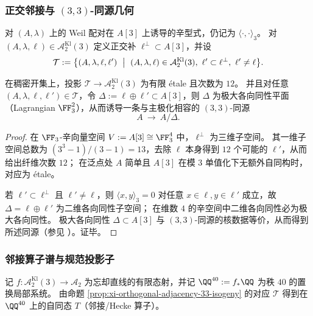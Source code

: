 \subsubsection{正交邻接与 \texorpdfstring{$(3,3)$}{(3,3)}-同源几何}
对 \((A,\lambda)\) 上的 Weil 配对在 \(A[3]\) 上诱导的辛型式，仍记为 \(\langle\cdot,\cdot\rangle_3\)。
对 \((A,\lambda,\ell)\in\mathcal A_2^{\mathrm{Kl}}(3)\) 定义正交补 \(\ell^\perp\subset A[3]\)，并设
\[
\mathcal T
:=
\bigl\{(A,\lambda,\ell,\ell')\ \bigm|\ (A,\lambda,\ell)\in\mathcal A_2^{\mathrm{Kl}}(3),\ \ell'\subset \ell^\perp,\ \ell'\neq \ell\bigr\}.
\]

\begin{proposition}\label{prop:xi-orthogonal-adjacency-33-isogeny}
在稠密开集上，投影 \(\mathcal T\to\mathcal A_2^{\mathrm{Kl}}(3)\) 为有限 \'etale 且次数为 \(12\)。
并且对任意 \((A,\lambda,\ell,\ell')\in\mathcal T\)，令 \(\Delta:=\ell\oplus \ell'\subset A[3]\)，则 \(\Delta\) 为极大各向同性平面（Lagrangian \(\FF_3^2\)），从而诱导一条与主极化相容的 \((3,3)\)-同源
\[
A\ \longrightarrow\ A/\Delta.
\]
\end{proposition}
\begin{proof}
在 \(\FF_3\)-辛向量空间 \(V:=A[3]\cong \FF_3^4\) 中，\(\ell^\perp\) 为三维子空间。
其一维子空间总数为 \((3^3-1)/(3-1)=13\)，去除 \(\ell\) 本身得到 \(12\) 个可能的 \(\ell'\)，从而给出纤维次数 \(12\)；
在泛点处 \(A\) 简单且 \(A[3]\) 在模 \(3\) 单值化下无额外自同构时，对应为 \'etale。
\par
若 \(\ell'\subset\ell^\perp\) 且 \(\ell'\neq \ell\)，则 \(\langle x,y\rangle_3=0\) 对任意 \(x\in\ell,y\in\ell'\) 成立，故 \(\Delta=\ell\oplus\ell'\) 为二维各向同性子空间；
在维数 \(4\) 的辛空间中二维各向同性必为极大各向同性。
极大各向同性 \(\Delta\subset A[3]\) 与 \((3,3)\)-同源的核数据等价，从而得到所述同源（参见 \cite{BruinFlynnTesta2014Descent33Isogeny}）。证毕。
\end{proof}

\subsubsection{邻接算子谱与规范投影子}
记 \(f:\mathcal A_2^{\mathrm{Kl}}(3)\to\mathcal A_2\) 为忘却直线的有限态射，并记 \(\QQ^{40}:=f_\ast\QQ\) 为秩 \(40\) 的置换局部系统。
由命题 \ref{prop:xi-orthogonal-adjacency-33-isogeny} 的对应 \(\mathcal T\) 得到在 \(\QQ^{40}\) 上的自同态 \(T\)（邻接/Hecke 算子）。

